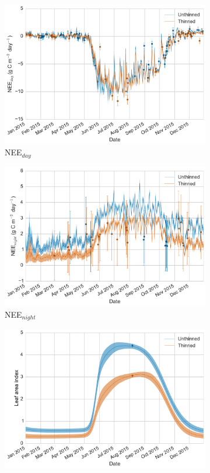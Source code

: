 \documentclass[12pt]{article}
\begin{document}
\begin{figure}[ht]
    \centering
    \begin{subfigure}[b]{0.48\textwidth}
        \includegraphics[width=\textwidth]{nee_day.pdf}
        \caption{NEE\(_{day}\)}
        \label{fig:nee_day}
    \end{subfigure}
    \begin{subfigure}[b]{0.48\textwidth}
        \includegraphics[width=\textwidth]{nee_night.pdf}
        \caption{NEE\(_{night}\)}
        \label{fig:nee_night}
    \end{subfigure}
    \begin{subfigure}[b]{0.48\textwidth}
        \includegraphics[width=\textwidth]{lai.pdf}

\end{subfigure}
\end{figure}
\end{document}

